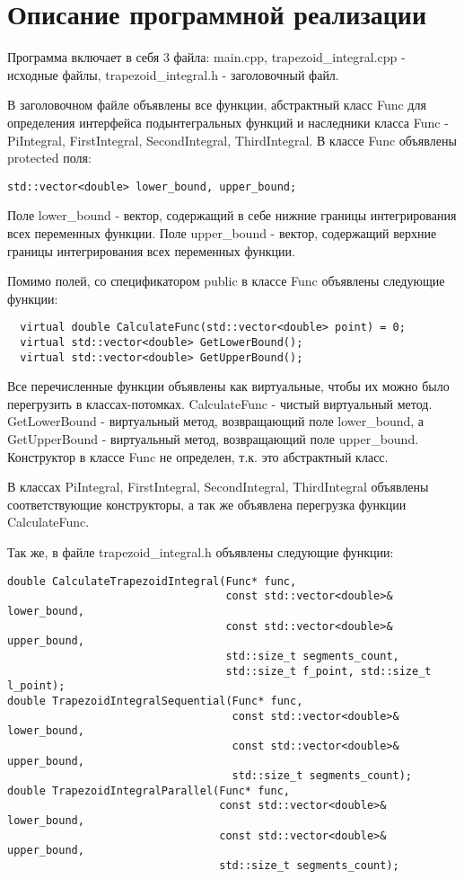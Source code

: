 \documentclass{report}
\begin{document}
\section*{Описание программной реализации}
\par Программа включает в себя 3 файла: main.cpp, trapezoid\_integral.cpp - исходные файлы, trapezoid\_integral.h - заголовочный файл.
\par В заголовочном файле объявлены все функции, абстрактный класс Func для определения интерфейса подынтегральных функций и наследники класса Func - PiIntegral, FirstIntegral, SecondIntegral, ThirdIntegral. В классе Func объявлены protected поля:
\begin{lstlisting}
std::vector<double> lower_bound, upper_bound;
\end{lstlisting}
\par Поле lower\_bound - вектор, содержащий в себе нижние границы интегрирования всех переменных функции. Поле upper\_bound - вектор, содержащий верхние границы интегрирования всех переменных функции. \par Помимо полей, со спецификатором public в классе Func объявлены следующие функции:
\begin{lstlisting}
  virtual double CalculateFunc(std::vector<double> point) = 0;
  virtual std::vector<double> GetLowerBound();
  virtual std::vector<double> GetUpperBound();
\end{lstlisting}
\par Все перечисленные функции объявлены как виртуальные, чтобы их можно было перегрузить в классах-потомках. CalculateFunc - чистый виртуальный метод. GetLowerBound - виртуальный метод, возвращающий поле lower\_bound, а GetUpperBound - виртуальный метод, возвращающий поле upper\_bound. Конструктор в классе Func не определен, т.к. это абстрактный класс.
\par В классах PiIntegral, FirstIntegral, SecondIntegral, ThirdIntegral объявлены соответствующие конструкторы, а так же объявлена перегрузка функции CalculateFunc.
\par Так же, в файле trapezoid\_integral.h объявлены следующие функции:
\begin{lstlisting}
double CalculateTrapezoidIntegral(Func* func,
                                  const std::vector<double>& lower_bound,
                                  const std::vector<double>& upper_bound,
                                  std::size_t segments_count,
                                  std::size_t f_point, std::size_t l_point);
double TrapezoidIntegralSequential(Func* func,
                                   const std::vector<double>& lower_bound,
                                   const std::vector<double>& upper_bound,
                                   std::size_t segments_count);
double TrapezoidIntegralParallel(Func* func,
                                 const std::vector<double>& lower_bound,
                                 const std::vector<double>& upper_bound,
                                 std::size_t segments_count);
\end{lstlisting}
\end{document}
